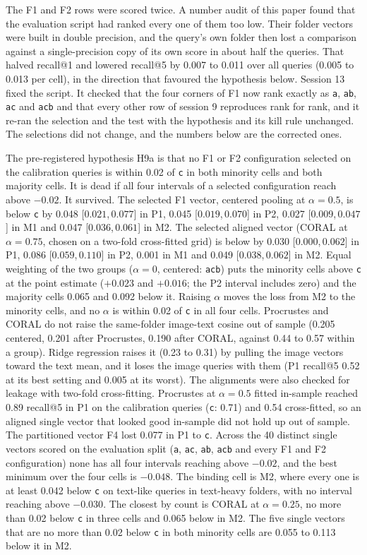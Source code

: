 \documentclass[11pt]{article}
\newcommand{\rep}[1]{\texttt{#1}}
\newcommand{\ci}[2]{[\ensuremath{#1},\,\ensuremath{#2}]}  %
\begin{document}
The F1 and F2 rows were scored twice. A number audit of this paper found that the evaluation script had ranked every one of them too low. Their folder vectors were built in double precision, and the query's own folder then lost a comparison against a single-precision copy of its own score in about half the queries. That halved recall@1 and lowered recall@5 by 0.007 to 0.011 over all queries (0.005 to 0.013 per cell), in the direction that favoured the hypothesis below. Session 13 fixed the script. It checked that the four corners of F1 now rank exactly as \rep{a}, \rep{ab}, \rep{ac} and \rep{acb} and that every other row of session 9 reproduces rank for rank, and it re-ran the selection and the test with the hypothesis and its kill rule unchanged. The selections did not change, and the numbers below are the corrected ones.

The pre-registered hypothesis H9a is that no F1 or F2 configuration selected on the calibration queries is within 0.02 of \rep{c} in both minority cells and both majority cells. It is dead if all four intervals of a selected configuration reach above $-0.02$. It survived. The selected F1 vector, centered pooling at $\alpha = 0.5$, is below \rep{c} by 0.048 \ci{0.021}{0.077} in P1, 0.045 \ci{0.019}{0.070} in P2, 0.027 \ci{0.009}{0.047} in M1 and 0.047 \ci{0.036}{0.061} in M2. The selected aligned vector (CORAL at $\alpha = 0.75$, chosen on a two-fold cross-fitted grid) is below by 0.030 \ci{0.000}{0.062} in P1, 0.086 \ci{0.059}{0.110} in P2, 0.001 in M1 and 0.049 \ci{0.038}{0.062} in M2. Equal weighting of the two groups ($\alpha = 0$, centered: \rep{acb}) puts the minority cells above \rep{c} at the point estimate ($+0.023$ and $+0.016$; the P2 interval includes zero) and the majority cells 0.065 and 0.092 below it. Raising $\alpha$ moves the loss from M2 to the minority cells, and no $\alpha$ is within 0.02 of \rep{c} in all four cells. Procrustes and CORAL do not raise the same-folder image-text cosine out of sample (0.205 centered, 0.201 after Procrustes, 0.190 after CORAL, against 0.44 to 0.57 within a group). Ridge regression raises it (0.23 to 0.31) by pulling the image vectors toward the text mean, and it loses the image queries with them (P1 recall@5 0.52 at its best setting and 0.005 at its worst). The alignments were also checked for leakage with two-fold cross-fitting. Procrustes at $\alpha = 0.5$ fitted in-sample reached 0.89 recall@5 in P1 on the calibration queries (\rep{c}: 0.71) and 0.54 cross-fitted, so an aligned single vector that looked good in-sample did not hold up out of sample. The partitioned vector F4 lost 0.077 in P1 to \rep{c}. Across the 40 distinct single vectors scored on the evaluation split (\rep{a}, \rep{ac}, \rep{ab}, \rep{acb} and every F1 and F2 configuration) none has all four intervals reaching above $-0.02$, and the best minimum over the four cells is $-0.048$. The binding cell is M2, where every one is at least 0.042 below \rep{c} on text-like queries in text-heavy folders, with no interval reaching above $-0.030$. The closest by count is CORAL at $\alpha = 0.25$, no more than 0.02 below \rep{c} in three cells and 0.065 below in M2. The five single vectors that are no more than 0.02 below \rep{c} in both minority cells are 0.055 to 0.113 below it in M2.
\end{document}
